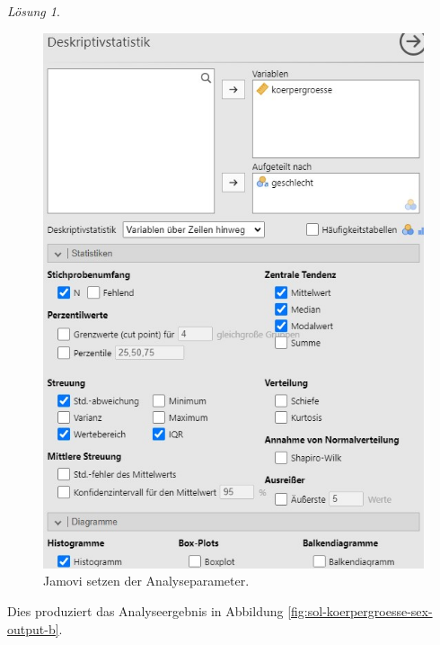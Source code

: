 \documentclass[
]{book}
\theoremstyle{definition}
\theoremstyle{definition}
\theoremstyle{definition}
\theoremstyle{definition}
\theoremstyle{remark}
\newtheorem*{solution}{Lösung}
\begin{document}
\begin{solution}
\begin{figure}
\includegraphics[width=1\linewidth]{figures/02-exr-koerpergroesse-sex-jmv-input-b} \caption{Jamovi setzen der Analyseparameter.}\label{fig:sol-koerpergroesse-sex-input-b}
\end{figure}

Dies produziert das Analyseergebnis in Abbildung \ref{fig:sol-koerpergroesse-sex-output-b}.


\end{solution}
\end{document}
